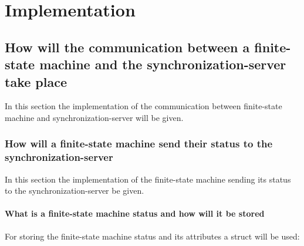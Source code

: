 \hypertarget{implementation}{%
\chapter{Implementation}\label{implementation}}

\hypertarget{how-will-the-communication-between-a-finite-state-machine-and-the-synchronization-server-take-place}{%
\section{How will the communication between a finite-state machine and
the synchronization-server take
place}\label{how-will-the-communication-between-a-finite-state-machine-and-the-synchronization-server-take-place}}

In this section the implementation of the communication between
finite-state machine and synchronization-server will be given.

\hypertarget{how-will-a-finite-state-machine-send-their-status-to-the-synchronization-server}{%
\subsection{How will a finite-state machine send their status to the
synchronization-server}\label{how-will-a-finite-state-machine-send-their-status-to-the-synchronization-server}}

In this section the implementation of the finite-state machine sending
its status to the synchronization-server be given.

\hypertarget{what-is-a-finite-state-machine-status-and-how-will-it-be-stored}{%
\subsubsection{What is a finite-state machine status and how will it be
stored}\label{what-is-a-finite-state-machine-status-and-how-will-it-be-stored}}

For storing the finite-state machine status and its attributes a struct
will be used:

\begin{Shaded}
\begin{Highlighting}[]
 
\NormalTok{\{}

\end{Highlighting}
\end{Shaded}

